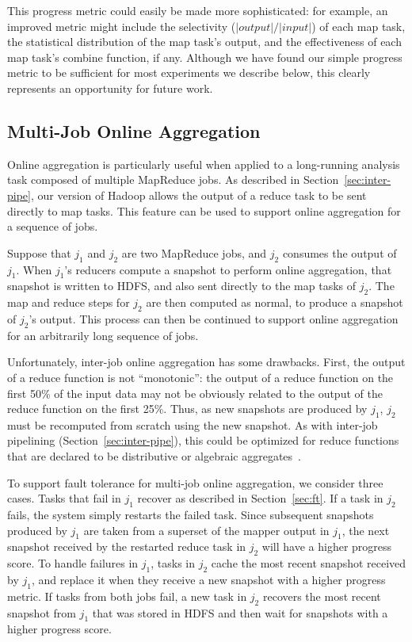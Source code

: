 This progress metric could easily be made more sophisticated: for example, an
improved metric might include the selectivity ($|output|/|input|$) of each map task, the
statistical distribution of the map task's output, and the effectiveness of each
map task's combine function, if any. 
Although we have found our simple progress metric to be
sufficient for most experiments we describe below, this clearly
represents an opportunity for future work.

\subsection{Multi-Job Online Aggregation}
\label{sec:online-multi}

Online aggregation is particularly useful when applied to a long-running
analysis task composed of multiple MapReduce jobs.  As described in
Section~\ref{sec:inter-pipe}, our version of Hadoop allows the output of a
reduce task to be sent directly to map tasks. This feature can be used to
support online aggregation for a sequence of jobs.

Suppose that $j_1$ and $j_2$ are two MapReduce jobs, and $j_2$
consumes the output of $j_1$. When $j_1$'s reducers compute a snapshot
to perform online aggregation, that snapshot is written to HDFS, and
also sent directly to the map tasks of $j_2$. The map and reduce steps
for $j_2$ are then computed as normal, to produce a snapshot of
$j_2$'s output. This process can then be continued to support online
aggregation for an arbitrarily long sequence of jobs.
  
Unfortunately, inter-job online aggregation has some drawbacks. First,
the output of a reduce function is not ``monotonic'': the output of a
reduce function on the first 50\% of the input data may not be
obviously related to the output of the reduce function on the first
25\%. Thus, as new snapshots are produced by $j_1$, $j_2$ must be
recomputed from scratch using the new snapshot. As with inter-job
pipelining (Section~\ref{sec:inter-pipe}), this could be optimized for
reduce functions that are declared to be distributive or algebraic
aggregates~\cite{datacube}.

To support fault tolerance for multi-job online aggregation, we consider three
cases. Tasks that fail in $j_1$ recover as described in Section~\ref{sec:ft}.
If a task in $j_2$ fails, the system simply restarts the failed task. Since
subsequent snapshots produced by $j_1$ are taken from a superset of the mapper
output in $j_1$, the next snapshot received by the restarted reduce task in
$j_2$ will have a higher progress score. To handle failures in $j_1$, tasks in
$j_2$ cache the most recent snapshot received by $j_1$, and replace it when they
receive a new snapshot with a higher progress metric. If tasks from both jobs
fail, a new task in $j_2$ recovers the most recent snapshot from $j_1$ that was
stored in HDFS and then wait for snapshots with a higher progress score.

